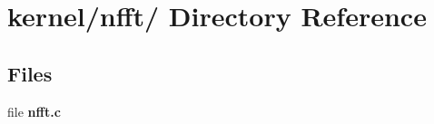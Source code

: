 \hypertarget{dir_000025}{
\section{kernel/nfft/ Directory Reference}
\label{dir_000025}
}
\subsection*{Files}
\begin{CompactItemize}
\item 
file {\bf nfft.c}
\end{CompactItemize}
